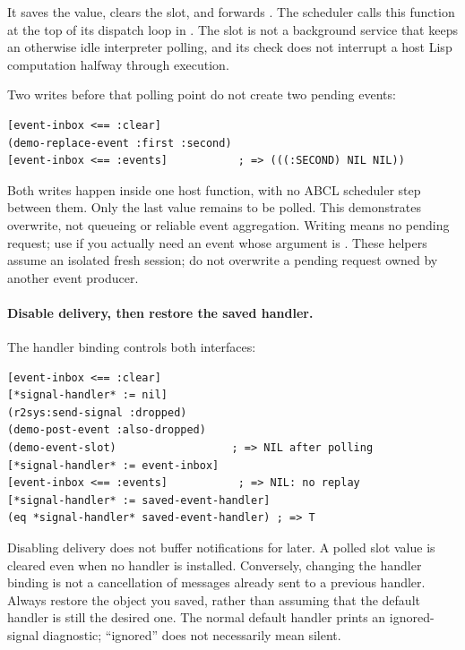 It saves the value, clears the slot, and forwards .
The scheduler calls this function at the top of its dispatch loop in
. The slot is not a background service that
keeps an otherwise idle interpreter polling, and its check does not
interrupt a host Lisp computation halfway through execution.

Two writes before that polling point do not create two pending events:

\begin{codeblock}
\begin{lstlisting}
[event-inbox <== :clear]
(demo-replace-event :first :second)
[event-inbox <== :events]           ; => (((:SECOND) NIL NIL))
\end{lstlisting}
\end{codeblock}

Both writes happen inside one host function, with no ABCL scheduler
step between them. Only the last value remains to be polled. This
demonstrates overwrite, not queueing or reliable event aggregation.
Writing  means no pending request; use
 if you actually need an event whose
argument is . These helpers assume an isolated fresh session;
do not overwrite a pending request owned by another event producer.

\paragraph{Disable delivery, then restore the saved handler.}
The handler binding controls both interfaces:

\begin{codeblock}
\begin{lstlisting}
[event-inbox <== :clear]
[*signal-handler* := nil]
(r2sys:send-signal :dropped)
(demo-post-event :also-dropped)
(demo-event-slot)                  ; => NIL after polling
[*signal-handler* := event-inbox]
[event-inbox <== :events]           ; => NIL: no replay
[*signal-handler* := saved-event-handler]
(eq *signal-handler* saved-event-handler) ; => T
\end{lstlisting}
\end{codeblock}

Disabling delivery does not buffer notifications for later. A polled
slot value is cleared even when no handler is installed. Conversely,
changing the handler binding is not a cancellation of messages already
sent to a previous handler. Always restore the object you saved, rather
than assuming that the default handler is still the desired one.
The normal default handler prints an ignored-signal diagnostic; ``ignored''
does not necessarily mean silent.

